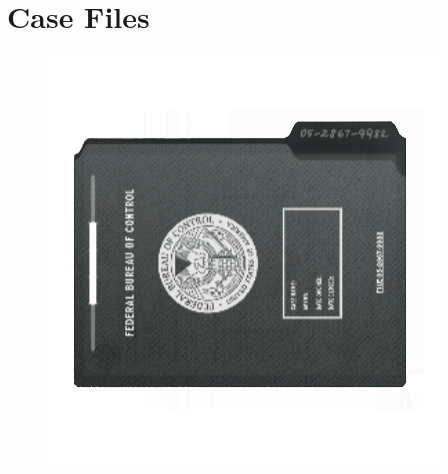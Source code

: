 \documentclass{article}
\begin{document}
	\section*{Case Files}
	\begin{figure}[ht!]
		\centering
		\includegraphics[width=0.7\linewidth]{images/CaseFiles}
		\label{fig:casefiles}
	\end{figure}
	
	
	
	
	
	
	
	
	
	
	
	
	
	
	
	
	
	
	
	
	
	
	
	
	
	
	
	
	
	
	
	
	
	
	
	
	
	
\end{document}
